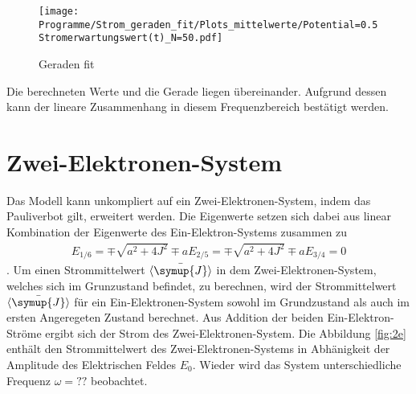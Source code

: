 \begin{figure}
    \centering
    \texttt{[image: Programme/Strom\_geraden\_fit/Plots\_mittelwerte/Potential=0.5Stromerwartungswert(t)\_N=50.pdf]}
    \caption{Geraden fit}
    \label{fig:geraden_fit}
\end{figure}

Die berechneten Werte und die Gerade liegen übereinander.
Aufgrund dessen kann der lineare Zusammenhang in diesem Frequenzbereich bestätigt werden.


\section{Zwei-Elektronen-System}
Das Modell kann unkompliert auf ein
Zwei-Elektronen-System, indem
das Pauliverbot gilt, erweitert werden.
Die Eigenwerte setzen sich dabei aus
linear Kombination der Eigenwerte
des Ein-Elektron-Systems
zusammen zu
\begin{align}
E_{1/6}=\mp\sqrt{a^2+4J^2}\mp a
E_{2/5}=\mp\sqrt{a^2+4J^2}\mp a
E_{3/4}=0
\end{align}.
Um einen Strommittelwert $\bar{\braket{\symup{J}}}$
in dem Zwei-Elektronen-System,
welches sich im Grunzustand befindet, zu berechnen,
wird der Strommittelwert $\bar{\braket{\symup{J}}}$
für ein Ein-Elektronen-System
sowohl im Grundzustand als
auch im ersten Angeregeten Zustand
berechnet. Aus Addition der beiden
Ein-Elektron-Ströme ergibt sich der Strom
des Zwei-Elektronen-System.
Die Abbildung \ref{fig:2e} enthält
den Strommittelwert des Zwei-Elektronen-Systems
in Abhänigkeit der Amplitude
des Elektrischen Feldes $E_0$.
Wieder wird das System
unterschiedliche Frequenz $\omega=??$
beobachtet.

